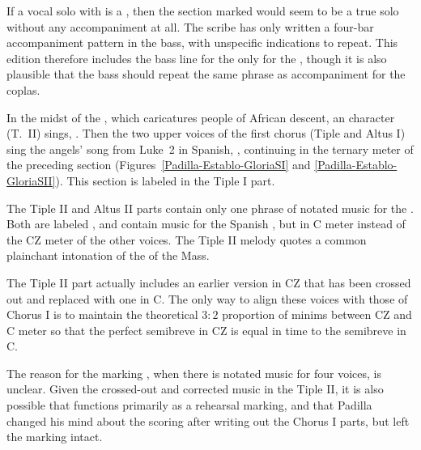 If a vocal solo with  is a , then the section marked 
 would seem to be a true solo without any accompaniment 
at all.
The scribe has only written a four-bar accompaniment pattern in the bass, with 
unspecific indications to repeat.
This edition therefore includes the bass line for the  only 
for the , though it is also plausible that the bass should
repeat the same phrase as accompaniment for the coplas.


In the midst of the , which caricatures people of African
descent, an  character (T.~II) sings, .
Then the two upper voices of the first chorus (Tiple and Altus I) sing the 
angels' song from Luke~2 in Spanish, , continuing in the ternary meter of the preceding section
(Figures~\ref{Padilla-Establo-GloriaSI} and \ref{Padilla-Establo-GloriaSII}).
This section is labeled  in the Tiple I part.

The Tiple II and Altus II parts contain only one phrase of notated music for 
the .
Both are labeled , and contain music for the 
Spanish , but in C meter instead of the CZ meter of the other 
voices.
The Tiple II melody quotes a common plainchant intonation of 
the  of the Mass.

The Tiple II part actually includes an earlier version in CZ that has been 
crossed out and replaced with one in C.
The only way to align these voices with those of Chorus I is to maintain the 
theoretical $3:2$ proportion of minims between CZ and C meter so that the 
perfect semibreve in CZ is equal in time to the semibreve in C.

The reason for the marking , when there is notated music for four 
voices, is unclear.
Given the crossed-out and corrected music in the Tiple II, it is also possible 
that  functions primarily as a rehearsal marking, and that Padilla 
changed his mind about the scoring after writing out the Chorus I parts, but 
left the marking intact.

